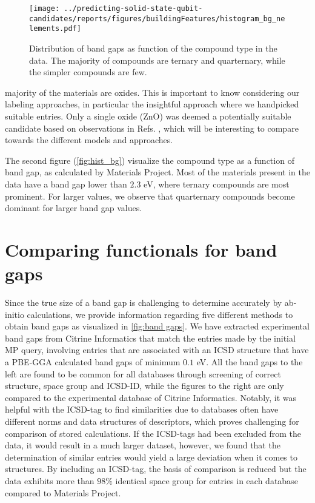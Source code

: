 \begin{figure}[]
      \centering
      \texttt{[image: ../predicting-solid-state-qubit-candidates/reports/figures/buildingFeatures/histogram\_bg\_nelements.pdf]}
      \vspace*{-130mm}
      \caption{Distribution of band gaps as function of the compound type in the data. The majority of compounds are ternary and quarternary, while the simpler compounds are few.}
      \label{fig:hist_bg}
\end{figure}

\noindent majority of the materials are oxides.
This is important to know considering our labeling approaches, in particular the insightful approach where we handpicked suitable entries.
Only a single oxide (ZnO) was deemed a potentially suitable candidate based on observations in Refs. \cite{Zhang2020, Zheng2014, Morfa2012}, which will be interesting to compare towards the different models and approaches.


The second figure (\autoref{fig:hist_bg}) visualize the compound type as a function of band gap, as calculated by Materials Project. Most of the materials present in the data have a band gap lower than $2.3$ eV, where ternary compounds are most prominent. For larger values, we observe that quarternary compounds become dominant for larger band gap values.

\section{Comparing functionals for band gaps}

Since the true size of a band gap is challenging to determine accurately by ab-initio calculations, we provide information regarding five different methods to obtain band gaps as visualized in \autoref{fig:band gaps}. We have extracted experimental band gaps from Citrine Informatics that match the entries made by the initial MP query, involving entries that are associated with an ICSD structure that have a PBE-GGA calculated band gaps of minimum $0.1$ eV.
All the band gaps to the left are found to be common for all databases through screening of correct structure, space group and ICSD-ID, while the figures to the right are only compared to the experimental database of Citrine Informatics.
Notably, it was helpful with the ICSD-tag to find similarities due to databases often have different norms and data structures of descriptors, which proves challenging for comparison of stored calculations.
If the ICSD-tags had been excluded from the data, it would result in a much larger dataset, however, we found that the determination of similar entries would yield a large deviation when it comes to structures. By including an ICSD-tag, the basis of comparison is reduced but the data exhibits more than $98\%$ identical space group for entries in each database compared to Materials Project.

